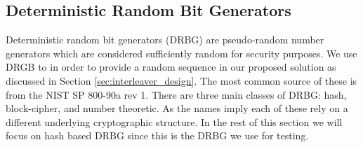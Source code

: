 \documentclass[sigconf, anonymous]{acmart}
\begin{document}
\subsection{Deterministic Random Bit Generators}

Deterministic random bit generators (DRBG) are pseudo-random number generators which are considered sufficiently random for security purposes. We use DRGB to in order to provide a random sequence in our proposed solution as discussed in Section \ref{sec:interleaver_design}. The most common source of these is from the NIST SP 800-90a rev 1\cite{barker2015nist90a}. There are three main classes of DRBG: hash, block-cipher, and number theoretic. As the names imply each of these rely on a different underlying cryptographic structure. In the rest of this section we will focus on hash based DRBG %
since this is the DRBG we use for testing. 

\end{document}
